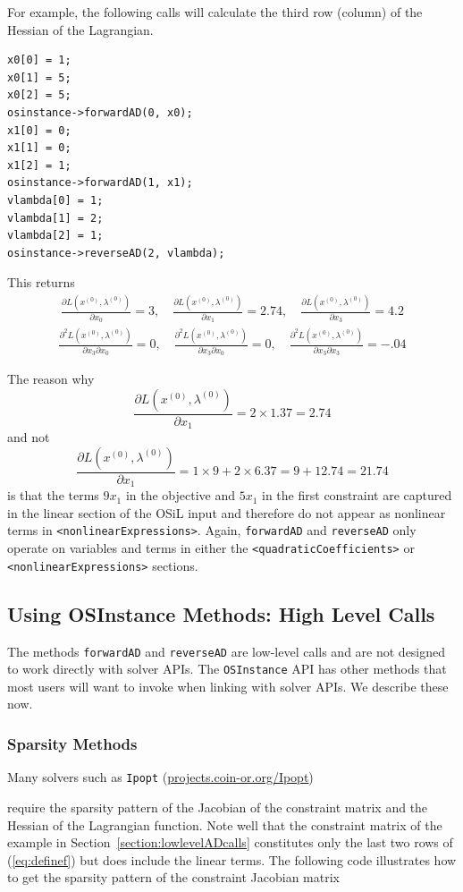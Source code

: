 \documentclass[11pt]{article}
\newcommand{\D}[2]{ \frac{\partial #1}{\partial #2} }
\newcommand{\DD}[3]{ \frac{\partial^2 #1}{\partial #2 \partial #3} }
\renewcommand{\_}{{\char"5F}}
\renewcommand{\{}{{\char"7B}}
\renewcommand{\}}{{\char"7D}}
\renewcommand{\^}{{\char"0D}}
\renewcommand{\'}{{\char"0D}}
\newif\ifknitro \knitrofalse    %
\begin{document}
\begin{enumerate}[Step 1:]
For example, the  following calls will calculate the third row (column) of the Hessian of the Lagrangian.
\begin{verbatim}
x0[0] = 1;
x0[1] = 5;
x0[2] = 5;
osinstance->forwardAD(0, x0);
x1[0] = 0;
x1[1] = 0;
x1[2] = 1;
osinstance->forwardAD(1, x1);
vlambda[0] = 1;
vlambda[1] = 2;
vlambda[2] = 1;
osinstance->reverseAD(2, vlambda);
\end{verbatim}
This returns
\begin{eqnarray*}
\D{L (x^{(0)}, \lambda^{(0)})}{x_{0}} = 3, \quad  \D{L (x^{(0)}, \lambda^{(0)})}{x_{1}} = 2.74, \quad  \D{L (x^{(0)}, \lambda^{(0)})}{x_{3}} = 4.2
\end{eqnarray*}
\begin{eqnarray*}
\DD{L(x^{(0)}, \lambda^{(0)})}{x_{3}}{x_{0}} =0, \quad  \DD{L(x^{(0)}, \lambda^{(0)})}{x_{3}}{x_{0}} = 0, \quad   \DD{L(x^{(0)}, \lambda^{(0)})}{x_{3}}{x_{3}} =  -.04
\end{eqnarray*}

The reason why
$$
\D{L (x^{(0)}, \lambda^{(0)})}{x_{1}} = 2 \times 1.37 = 2.74
$$
and not
$$
\D{L (x^{(0)}, \lambda^{(0)})}{x_{1}} = 1 \times  9 + 2 \times 6.37 = 9 + 12.74 = 21.74
$$
is that the terms $9x_1$ in the objective and $5x_1$ in the first constraint
are captured in the linear section of the OSiL input and therefore do not appear as nonlinear terms
in {\tt  <nonlinearExpressions>}. Again, {\tt forwardAD} and {\tt reverseAD} only operate on variables and terms
in either the {\tt <quadraticCoefficients>} or {\tt <nonlinearExpressions>} sections.

\subsection{Using OSInstance Methods: High Level Calls}

The methods {\tt forwardAD} and {\tt reverseAD} are low-level calls and are not designed to work directly with solver APIs. The {\tt OSInstance} API has other methods that most users will want to invoke when linking with solver APIs.  We describe these now.


\subsubsection{Sparsity Methods}

Many solvers such as {\tt Ipopt} (\url{projects.coin-or.org/Ipopt}) 
\ifknitro or Knitro\index{Knitro} (\url{www.ziena.com}) \fi
require the sparsity pattern of the Jacobian of the constraint matrix and the Hessian of the Lagrangian function.
Note well that the constraint matrix of the example in Section~\ref{section:lowlevelADcalls}
constitutes only the last two rows of (\ref{eq:definef}) but does include the linear terms.
The following code illustrates how to get the sparsity pattern of the constraint Jacobian matrix


\end{enumerate}
\end{document}
